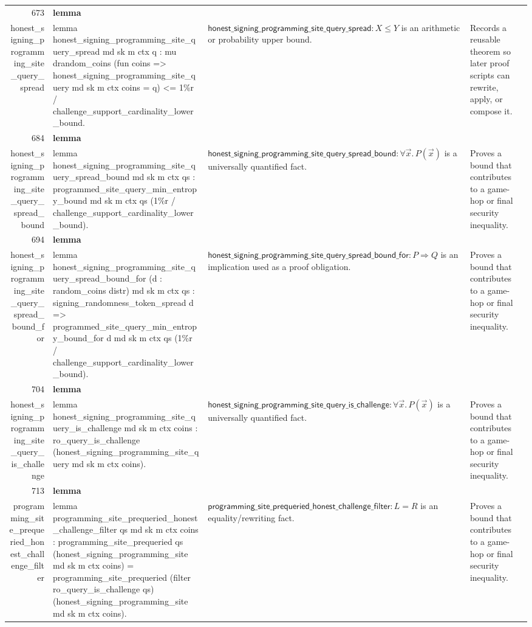 \documentclass[10pt]{article}
\newcommand{\ec}[1]{\begingroup\ttfamily\scriptsize #1\endgroup}
\begin{document}
\begin{longtable}{r L{0.17\textwidth} L{0.26\textwidth} L{0.27\textwidth} L{0.20\textwidth}}
673 & \textbf{lemma}\\\ec{honest\_signing\_programming\_site\_query\_spread} & \ec{lemma honest\_signing\_programming\_site\_query\_spread md sk m ctx q : mu drandom\_coins (fun coins => honest\_signing\_programming\_site\_query md sk m ctx coins = q) <= 1\%r / challenge\_support\_cardinality\_lower\_bound.} & \(\mathsf{honest\_signing\_programming\_site\_query\_spread} : X \le Y\) is an arithmetic or probability upper bound. & Records a reusable theorem so later proof scripts can rewrite, apply, or compose it. \\
684 & \textbf{lemma}\\\ec{honest\_signing\_programming\_site\_query\_spread\_bound} & \ec{lemma honest\_signing\_programming\_site\_query\_spread\_bound md sk m ctx qs : programmed\_site\_query\_min\_entropy\_bound md sk m ctx qs (1\%r / challenge\_support\_cardinality\_lower\_bound).} & \(\mathsf{honest\_signing\_programming\_site\_query\_spread\_bound} : \forall \vec{x}.\, P(\vec{x})\) is a universally quantified fact. & Proves a bound that contributes to a game-hop or final security inequality. \\
694 & \textbf{lemma}\\\ec{honest\_signing\_programming\_site\_query\_spread\_bound\_for} & \ec{lemma honest\_signing\_programming\_site\_query\_spread\_bound\_for (d : random\_coins distr) md sk m ctx qs : signing\_randomness\_token\_spread d => programmed\_site\_query\_min\_entropy\_bound\_for d md sk m ctx qs (1\%r / challenge\_support\_cardinality\_lower\_bound).} & \(\mathsf{honest\_signing\_programming\_site\_query\_spread\_bound\_for} : P \Rightarrow Q\) is an implication used as a proof obligation. & Proves a bound that contributes to a game-hop or final security inequality. \\
704 & \textbf{lemma}\\\ec{honest\_signing\_programming\_site\_query\_is\_challenge} & \ec{lemma honest\_signing\_programming\_site\_query\_is\_challenge md sk m ctx coins : ro\_query\_is\_challenge (honest\_signing\_programming\_site\_query md sk m ctx coins).} & \(\mathsf{honest\_signing\_programming\_site\_query\_is\_challenge} : \forall \vec{x}.\, P(\vec{x})\) is a universally quantified fact. & Proves a bound that contributes to a game-hop or final security inequality. \\
713 & \textbf{lemma}\\\ec{programming\_site\_prequeried\_honest\_challenge\_filter} & \ec{lemma programming\_site\_prequeried\_honest\_challenge\_filter qs md sk m ctx coins : programming\_site\_prequeried qs (honest\_signing\_programming\_site md sk m ctx coins) = programming\_site\_prequeried (filter ro\_query\_is\_challenge qs) (honest\_signing\_programming\_site md sk m ctx coins).} & \(\mathsf{programming\_site\_prequeried\_honest\_challenge\_filter} : L = R\) is an equality/rewriting fact. & Proves a bound that contributes to a game-hop or final security inequality. \\

\end{longtable}
\end{document}
